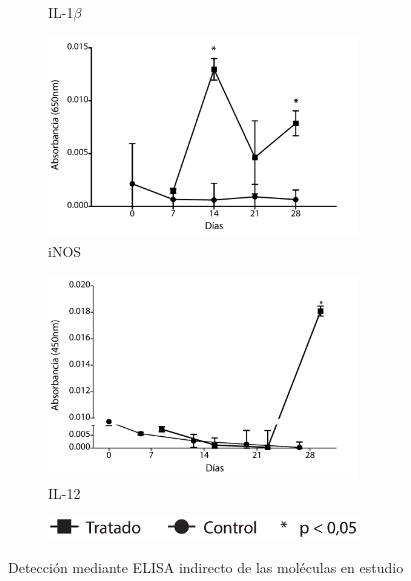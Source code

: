 \documentclass[12pt,letterpaper,oneside]{scrbook}
\begin{document}
\begin{figure}[h]
\begin{subfigure}{0.5\textwidth}
        \caption{IL-1$\beta$}
        \label{fig:elisa:il1b}
    \end{subfigure}
    \begin{subfigure}{0.5\textwidth}
        \includegraphics[width=0.9\textwidth]{eps/ELISA/pdf/einos12}
        \caption{iNOS}
        \label{fig:elisa:inos}
    \end{subfigure}
    \begin{subfigure}{0.5\textwidth}
        \includegraphics[width=0.9\textwidth]{eps/ELISA/pdf/eil12}
        \caption{IL-12}
        \label{fig:elisa:il12}
    \end{subfigure}
    \begin{subfigure}{0.5\textwidth}
        \includegraphics[width=0.9\textwidth]{eps/qPCR/leyenda}
    \end{subfigure}
    \caption{Detección mediante ELISA indirecto de las moléculas en estudio}
    \label{fig:elisa}
\end{figure}
\end{document}

